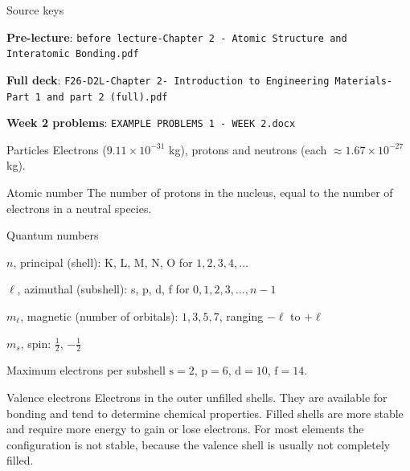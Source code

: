 \documentclass[11pt]{article}
\begin{document}
\makenotestitle

\begin{keydef}{Source keys}
\raggedright
\begin{points}
\item \textbf{Pre-lecture}: \texttt{before lecture-Chapter 2 - Atomic Structure
and Interatomic Bonding.pdf}
\item \textbf{Full deck}: \texttt{F26-D2L-Chapter 2- Introduction to
Engineering Materials-Part 1 and part 2 (full).pdf}
\item \textbf{Week 2 problems}: \texttt{EXAMPLE PROBLEMS 1 - WEEK 2.docx}
\end{points}
\end{keydef}


\begin{keydef}{Particles}
Electrons ($9.11\times10^{-31}$ kg), protons and neutrons (each
$\approx 1.67\times10^{-27}$ kg). 
\end{keydef}

\begin{keydef}{Atomic number}
The number of protons in the nucleus, equal to the number of electrons in a
neutral species. 
\end{keydef}

\begin{keydef}{Quantum numbers}
\begin{points}
\item $n$, principal (shell): K, L, M, N, O for $1, 2, 3, 4, \dots$
\item $\ell$, azimuthal (subshell): s, p, d, f for $0, 1, 2, 3, \dots, n-1$
\item $m_\ell$, magnetic (number of orbitals): $1, 3, 5, 7$, ranging $-\ell$ to
$+\ell$
\item $m_s$, spin: $\tfrac{1}{2}$, $-\tfrac{1}{2}$
\end{points}
\end{keydef}

\begin{keydef}{Maximum electrons per subshell}
$\mathrm{s}=2$, $\mathrm{p}=6$, $\mathrm{d}=10$, $\mathrm{f}=14$.
\end{keydef}

\begin{keydef}{Valence electrons}
Electrons in the outer unfilled shells. They are available for bonding and tend
to determine chemical properties. Filled shells are more stable and require more
energy to gain or lose electrons. For most elements the configuration is not
stable, because the valence shell is usually not completely filled.
\end{keydef}
\end{document}
